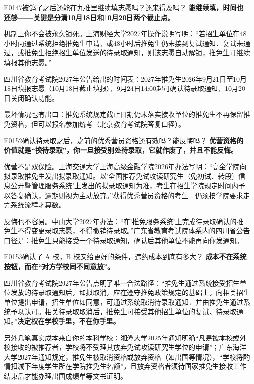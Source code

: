 \begin{qa}{E0147}{被鸽了之后还能在九推里继续填志愿吗？还来得及吗？}
\textbf{能继续填，时间也还够——关键是分清10月18日和10月20日两个截止点。}

机制上你不会被永久锁死。上海财经大学2027年操作说明写明：“若招生单位在48小时内通过系统拒绝推免生申请，或48小时后推免生仍未接到复试通知、复试未通过，或推免生拒绝招生单位发送的待录取通知，则该志愿自动解锁，推免生可继续填报其他志愿。”

四川省教育考试院2027年公告给出的时间表：2027年推免生2026年9月21日至10月18日填报志愿（10月18日截止填报），9月24日14:00起可确认待录取通知，10月20日关闭确认功能。

最坏情况也有出口：推免系统规定截止日期仍未落实接收单位的推免生不再保留推免资格，但可以报名参加统考（北京教育考试院答复口径）。
\end{qa}

\begin{qa}{E0152}{确认待录取之后，之前的优秀营员资格还有效吗？能反悔吗？}
\textbf{优营资格的价值就是“换待录取”，你一旦接受别处待录取，它就作废了，并且不能反悔。}

优营不是双保险。上海交通大学上海高级金融学院2026年办法写明：“高金学院向拟录取推免生发出拟录取通知。以'全国推荐免试攻读研究生（免初试、转段）信息公开暨管理服务系统'上发出的拟录取通知为准，考生在招生学院规定时间内予以答复确认，逾期则视为主动放弃。”获得优秀营员资格的考生，仍须按学院要求走完系统流程才算数。

反悔也不容易。中山大学2027年办法：“在'推免服务系统'上完成待录取确认的推免生不得变更录取志愿，不得撤销待录取。”广东省教育考试院体系内的四川省公告口径是：推免生只能接受一个待录取通知，确认后其他单位不能再向你发通知。
\end{qa}

\begin{qa}{E0153}{确认了 A 校，B 校又给更好的条件，违约成本到底有多大？}
\textbf{成本不在系统按钮，而在“对方学校同不同意放”。}

四川省教育考试院2027年公告点明了唯一合法路径：“推免生通过系统接受招生单位发放的待录取通知后，如拟取消，应在遵守推免政策规定的基础上，向相关招生单位提出申请，招生单位如同意，可通过系统取消待录取通知，并由推免生通过系统予以认可。相关待录取取消后，推免生可接受其他招生单位的复试、待录取通知。”\textbf{决定权在学校手里，不在你手里。}

另外几笔真实成本来自你的本科学校：湘潭大学2025年通知明确“凡是被本校或外校接收的被推荐者，学校将不受理其放弃免试攻读研究生学位的申请”；广东海洋大学2027年通知规定，推免生被取消资格或放弃资格（如出国等情况），“学校将酌情扣减下年度学生所在学院推免生名额”，且放弃资格者须待国家推免生接收工作结束后才能办理出国成绩单等文书证明。
\end{qa}

